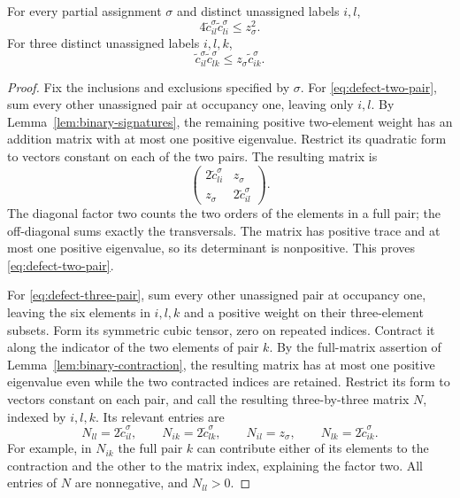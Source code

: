 \begin{lemma}
\label{lem:defect-inequalities}
For every partial assignment \(\sigma\) and distinct unassigned
labels \(i,l\),
\begin{equation}
 4\widetilde c_{il}^{\sigma}\widetilde c_{li}^{\sigma}
 \le z_\sigma^2.
 \label{eq:defect-two-pair}
\end{equation}
For three distinct unassigned labels \(i,l,k\),
\begin{equation}
 \widetilde c_{il}^{\sigma}\widetilde c_{lk}^{\sigma}
 \le z_\sigma\widetilde c_{ik}^{\sigma}.
 \label{eq:defect-three-pair}
\end{equation}
\end{lemma}

\begin{proof}
Fix the inclusions and exclusions specified by \(\sigma\).
For \eqref{eq:defect-two-pair}, sum every other unassigned pair at
occupancy one, leaving only \(i,l\).
By Lemma~\ref{lem:binary-signatures}, the remaining positive
two-element weight has an addition matrix with at most one
positive eigenvalue.
Restrict its quadratic form to vectors constant on each of the two
pairs.
The resulting matrix is
\[
 \begin{pmatrix}
  2\widetilde c_{li}^{\sigma}&z_\sigma\\
  z_\sigma&2\widetilde c_{il}^{\sigma}
 \end{pmatrix}.
\]
The diagonal factor two counts the two orders of the elements in
a full pair; the off-diagonal sums exactly the transversals.
The matrix has positive trace and at most one positive eigenvalue,
so its determinant is nonpositive.
This proves \eqref{eq:defect-two-pair}.

For \eqref{eq:defect-three-pair}, sum every other unassigned pair
at occupancy one, leaving the six elements in \(i,l,k\) and a
positive weight on their three-element subsets.
Form its symmetric cubic tensor, zero on repeated indices.
Contract it along the indicator of the two elements of pair \(k\).
By the full-matrix assertion of
Lemma~\ref{lem:binary-contraction}, the resulting matrix has at
most one positive eigenvalue even while the two contracted indices
are retained.
Restrict its form to vectors constant on each pair, and call the
resulting three-by-three matrix \(N\), indexed by \(i,l,k\).
Its relevant entries are
\begin{equation}
 N_{ll}=2\widetilde c_{il}^{\sigma},
 \qquad
 N_{ik}=2\widetilde c_{lk}^{\sigma},
 \qquad
 N_{il}=z_\sigma,
 \qquad
 N_{lk}=2\widetilde c_{ik}^{\sigma}.
 \label{eq:contracted-defect-entries}
\end{equation}
For example, in \(N_{ik}\) the full pair \(k\) can contribute either
of its elements to the contraction and the other to the matrix
index, explaining the factor two.
All entries of \(N\) are nonnegative, and \(N_{ll}>0\).


\end{proof}

